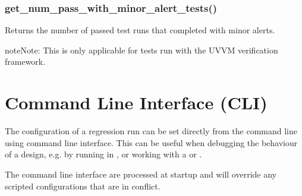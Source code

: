 \documentclass[letterpaper,10pt,english]{sphinxmanual}
\begin{document}
\subsection{get\_num\_pass\_with\_minor\_alert\_tests()}
\label{\detokenize{api:get-num-pass-with-minor-alert-tests}}
\sphinxAtStartPar
Returns the number of passed test runs that completed with minor alerts.

\begin{sphinxadmonition}{note}{Note:}
\sphinxAtStartPar
This is only applicable for tests run with the UVVM verification framework.
\end{sphinxadmonition}

\begin{sphinxVerbatim}[commandchars=\\\{\}]
\end{sphinxVerbatim}

\sphinxAtStartPar
{}

\begin{sphinxVerbatim}[commandchars=\\\{\}]
  
\end{sphinxVerbatim}


\chapter{Command Line Interface (CLI)}
\label{\detokenize{cli:command-line-interface-cli}}\label{\detokenize{cli::doc}}
\begin{DUlineblock}{0em}
\item[] The configuration of a regression run can be set directly from the command line using command line interface.
This can be useful when debugging the behaviour of a design, e.g. by running in {\hyperref[\detokenize{gui::doc}]{}},
or working with a {\hyperref[\detokenize{intro:testcase}]{}} or {\hyperref[\detokenize{intro:test-group}]{}}.
\item[] The command line interface are processed at startup and will override any scripted configurations that are in conflict.
\end{DUlineblock}
\end{document}
